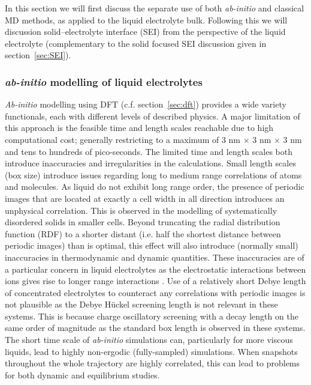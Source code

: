 \documentclass[../main.tex]{subfiles}
\begin{document}
In this section we will first discuss the separate use of both \textit{ab-initio} and classical MD methods, as applied to the liquid electrolyte bulk. Following this we will discussion solid--electrolyte interface (SEI) from the perspective of the liquid electrolyte (complementary to the solid focused SEI discussion given in section~\ref{sec:SEI}).

\subsubsection{\textit{ab-initio} modelling of liquid electrolytes}

\textit{Ab-initio} modelling using DFT (c.f. section~\ref{sec:dft}) provides a wide variety functionals, each with different levels of described physics. A major limitation of this approach is the feasible time and length scales reachable due to high computational cost; generally restricting to a maximum of 3 nm $\times$ 3 nm $\times$ 3 nm and tens to hundreds of pico-seconds. The limited time and length scales both introduce inaccuracies and irregularities in the calculations. Small length scales (box size) introduce issues regarding long to medium range correlations of atoms and molecules. As liquid do not exhibit long range order, the presence of periodic images that are located at exactly a cell width in all direction introduces an unphysical correlation. This is observed in the modelling of systematically disordered solids in smaller cells. Beyond truncating the radial distribution function (RDF) to a shorter distant (i.e. half the shortest distance between periodic images) than is optimal, this effect will also introduce (normally small) inaccuracies in thermodynamic and dynamic quantities\cite{Binder2009book, yeh_system-size_2004,botan_diffusion_2015,horbach_finite_1996}. These inaccuracies are of a particular concern in liquid electrolytes as the electrostatic interactions between ions gives rise to longer range interactions \cite{coles_correlation_2020}. Use of a relatively short Debye length of concentrated electrolytes to counteract any correlations with periodic images is not plausible as the Debye H\"{u}ckel screening length is not relevant in these systems. This is because charge oscillatory screening with a decay length on the same order of magnitude as the standard box length is observed in these systems\cite{coles_correlation_2020}. The short time scale of \textit{ab-initio} simulations can, particularly for more viscous liquids, lead to highly non-ergodic (fully-sampled) simulations. When snapshots throughout the whole trajectory are highly correlated\cite{frenkel_understanding_2002}, this can lead to problems for both dynamic and equilibrium studies. 
\end{document}
